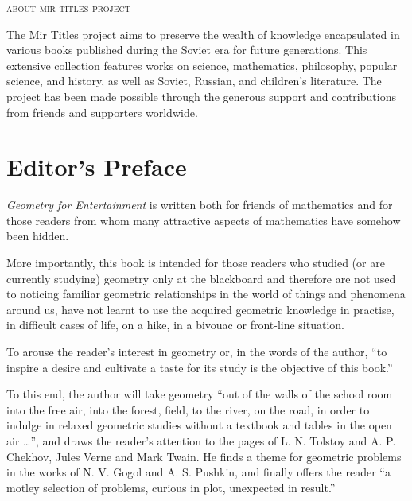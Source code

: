 \cleardoublepage
\thispagestyle{empty}
\vspace*{\fill}
\begin{center}
\textsc{\large about mir titles project}
\end{center}
The Mir Titles project aims to preserve the wealth of knowledge encapsulated in various books published during the Soviet era for future generations. This extensive collection features works on science, mathematics, philosophy, popular science, and history, as well as Soviet, Russian, and children's literature. The project has been made possible through the generous support and contributions from friends and supporters worldwide.





\cleardoublepage

 \tableofcontents
 
 \cleardoublepage

\chapter{Editor's Preface}
\label{editor-preface}


\emph{Geometry for Entertainment} is written both for friends of mathematics and for those readers from whom many attractive aspects of mathematics have somehow been hidden.

More importantly, this book is intended for those readers who studied (or are currently studying) geometry only at the blackboard and therefore are not used to noticing familiar geometric relationships in the world of things and phenomena around us, have not learnt to use the acquired geometric knowledge in practise, in difficult cases of life, on a hike, in a bivouac or front-line situation.

To arouse the reader's interest in geometry or, in the words of the author, ``to inspire a desire and cultivate a taste for its study is the objective of this book.''

To this end, the author will take geometry ``out of the walls of the school room into the free air, into the forest, field, to the river, on the road, in order to indulge in relaxed geometric studies without a textbook and tables in the open air \ldots{}'', and draws the reader's attention to the pages of L. N. Tolstoy and A. P. Chekhov, Jules Verne and Mark Twain. He finds a theme for geometric problems in the works of N. V. Gogol and A. S. Pushkin, and finally offers the reader ``a motley selection of problems, curious in plot, unexpected in result.''

